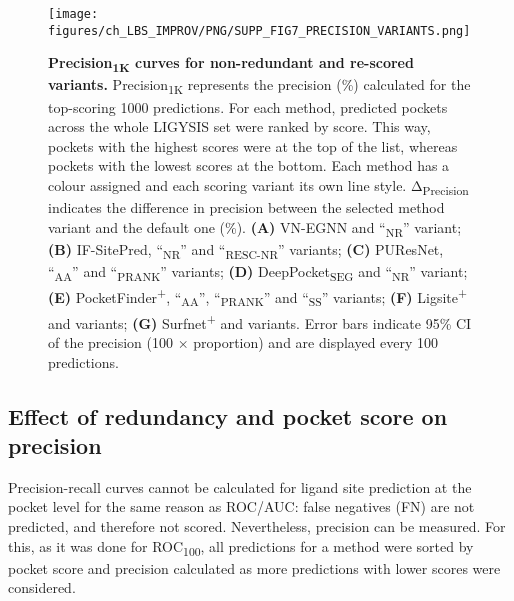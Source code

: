 \begin{figure}[ht!]
    \centering
    \texttt{[image: figures/ch\_LBS\_IMPROV/PNG/SUPP\_FIG7\_PRECISION\_VARIANTS.png]}
    \caption[Precision\textsubscript{1K} curves for non-redundant and re-scored variants]{\textbf{Precision\textsubscript{1K} curves for non-redundant and re-scored variants.}  Precision\textsubscript{1K} represents the precision (\%) calculated for the top-scoring 1000 predictions. For each method, predicted pockets across the whole LIGYSIS set were ranked by score. This way, pockets with the highest scores were at the top of the list, whereas pockets with the lowest scores at the bottom. Each method has a colour assigned and each scoring variant its own line style. Δ\textsubscript{Precision} indicates the difference in precision between the selected method variant and the default one (\%).  \textbf{(A)} VN-EGNN and ``\textsubscript{NR}'' variant; \textbf{(B)} IF-SitePred, ``\textsubscript{NR}'' and ``\textsubscript{RESC-NR}'' variants; \textbf{(C)} PUResNet, ``\textsubscript{AA}'' and ``\textsubscript{PRANK}'' variants; \textbf{(D)} DeepPocket\textsubscript{SEG} and ``\textsubscript{NR}'' variant; \textbf{(E)} PocketFinder\textsuperscript{+}, ``\textsubscript{AA}'', ``\textsubscript{PRANK}'' and ``\textsubscript{SS}'' variants; \textbf{(F)} Ligsite\textsuperscript{+} and variants; \textbf{(G)} Surfnet\textsuperscript{+} and variants. Error bars indicate 95\% CI of the precision (100 $\times$ proportion) and are displayed every 100 predictions.}
    \label{fig:pocket_precision_variants}
\end{figure}

\subsection{Effect of redundancy and pocket score on precision}

Precision-recall curves cannot be calculated for ligand site prediction at the pocket level for the same reason as ROC/AUC: false negatives (FN) are not predicted, and therefore not scored. Nevertheless, precision can be measured. For this, as it was done for ROC\textsubscript{100}, all predictions for a method were sorted by pocket score and precision calculated as more predictions with lower scores were considered.

